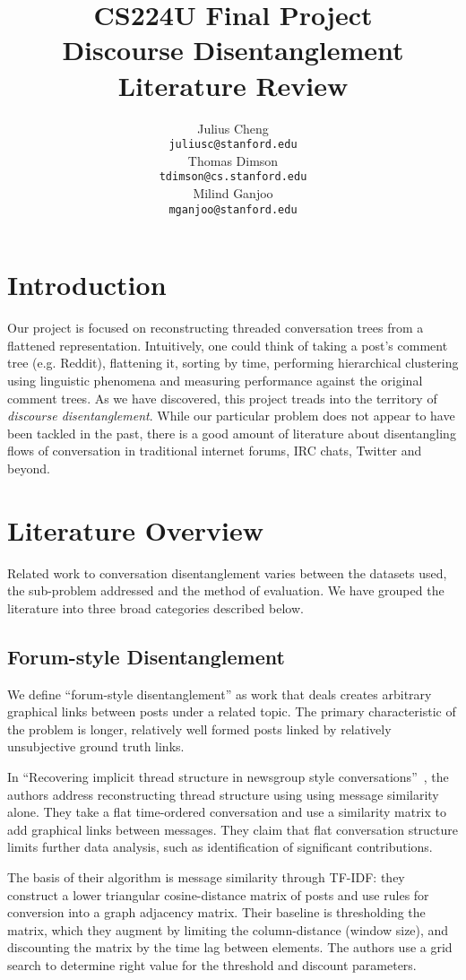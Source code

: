 \documentclass[11pt]{article}
\title{{\small CS224U Final Project} \\ Discourse Disentanglement \\Literature Review}
\author{Julius Cheng \\
  {\tt juliusc@stanford.edu}
  \\\And
  Thomas Dimson  \\
  {\tt tdimson@cs.stanford.edu}
  \\\AND
  Milind Ganjoo \\
  {\tt mganjoo@stanford.edu}
}
\date{}
\newcommand{\titlecite}[2]{``#1''~\cite{#2}}
\begin{document}
\maketitle

\section{Introduction}
Our project is focused on reconstructing threaded conversation trees
from a flattened representation. Intuitively, one could think of 
taking a post's comment tree (e.g. Reddit), flattening it, sorting by time, performing
hierarchical clustering using linguistic phenomena and measuring performance 
against the original comment trees. As we have
discovered, this project treads into the territory of \textit{discourse disentanglement}.
While our particular problem does not appear to have been tackled in the past,
there is a good amount of literature about disentangling flows of conversation
in traditional internet forums, IRC chats, Twitter and beyond.

\section{Literature Overview}
Related work to conversation disentanglement varies between the datasets used, the 
sub-problem addressed and the method of evaluation. We have grouped the literature into
three broad categories described below.

\subsection{Forum-style Disentanglement}
\label{sec:threaded}
We define ``forum-style disentanglement'' as work that deals creates arbitrary
graphical links between posts under a related topic. The primary characteristic of the problem 
is longer, relatively well formed posts linked by relatively unsubjective ground truth links.

In \titlecite{Recovering implicit thread structure in newsgroup style conversations}{Wang2008a}, 
the authors address reconstructing thread structure using using 
message similarity alone. They take a flat
time-ordered conversation and use a similarity matrix to add graphical
links between messages. They claim that flat conversation structure
limits further data analysis, such as identification of significant
contributions. 

The basis of their algorithm is message similarity through TF-IDF: they
construct a lower triangular cosine-distance matrix of posts and use rules 
for conversion into a graph adjacency matrix. Their baseline is thresholding the
matrix, which they augment by limiting the column-distance (window size), and discounting
the matrix by the time lag between elements. The authors use a grid search to
determine right value for the threshold and discount parameters.
\end{document}
